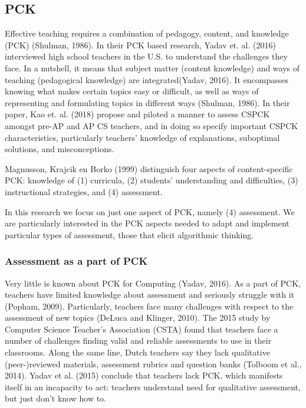 \subsection*{PCK}

Effective teaching requires a combination of pedagogy, content, and knowledge (PCK) (Shulman, 1986).  In their PCK based research, Yadav et. al. (2016) interviewed high school teachers in the U.S. to understand the challenges they face.  In a nutshell, it means that subject matter (content knowledge) and ways of teaching (pedagogical knowledge) are integrated(Yadav, 2016). It encompasses knowing what makes certain topics easy or difficult, as well as ways of representing and formulating topics in different ways (Shulman, 1986). In their paper, Kao et. al. (2018) propose and piloted a manner to assess CSPCK amongst pre-AP and AP CS teachers, and in doing so specify important CSPCK characteristics, particularly teachers' knowledge of explanations, suboptimal solutions, and misconceptions.

Magnusson, Krajcik en Borko (1999) distinguish four aspects of content-specific PCK: knowledge of
(1) curricula, (2) students' understanding and difficulties, (3) instructional strategies, and (4) assessment.


In this research we focus on just one aspect of PCK, namely (4) assessment. We are particularly interested in the PCK aspects needed to adapt and implement particular types of assessment, those that elicit algorithmic thinking.


\subsubsection*{Assessment as a part of PCK}
Very little is known about PCK for Computing (Yadav, 2016). As a part of PCK, teachers have limited knowledge about assessment and seriously struggle with it (Popham, 2009). Particularly, teachers face many challenges with respect to the assessment of new topics (DeLuca and Klinger, 2010). The 2015 study by Computer Science Teacher's Association (CSTA) found that teachers face a number of challenges finding valid and reliable assessments to use in their classrooms. Along the same line, Dutch teachers say they lack qualitative (peer-)reviewed materials, assessment rubrics and question banks (Tolboom et al., 2014). Yadav et al. (2015) conclude that teachers lack PCK, which manifests itself in an incapacity to act: teachers understand need for qualitative assessment, but just don't know how to.

